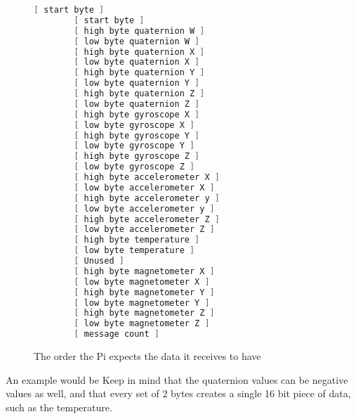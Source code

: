 \begin{figure}[H]
    \begin{lstlisting}[language=c++,firstnumber=0]
        [ start byte ]
        [ start byte ]
        [ high byte quaternion W ]
        [ low byte quaternion W ]
        [ high byte quaternion X ]
        [ low byte quaternion X ]
        [ high byte quaternion Y ]
        [ low byte quaternion Y ]
        [ high byte quaternion Z ]
        [ low byte quaternion Z ]
        [ high byte gyroscope X ]
        [ low byte gyroscope X ]
        [ high byte gyroscope Y ]
        [ low byte gyroscope Y ]
        [ high byte gyroscope Z ]
        [ low byte gyroscope Z ]
        [ high byte accelerometer X ]
        [ low byte accelerometer X ]
        [ high byte accelerometer y ]
        [ low byte accelerometer y ]
        [ high byte accelerometer Z ]
        [ low byte accelerometer Z ]
        [ high byte temperature ]
        [ low byte temperature ]
        [ Unused ]
        [ high byte magnetometer X ]
        [ low byte magnetometer X ]
        [ high byte magnetometer Y ]
        [ low byte magnetometer Y ]
        [ high byte magnetometer Z ]
        [ low byte magnetometer Z ]
        [ message count ]
    \end{lstlisting}
\caption{The order the Pi expects the data it receives to have}
\label{fig::dataformat}
\end{figure}

An example would be  
Keep in mind that the quaternion values can be negative values as well, and that every set of 2 bytes creates a single 16 bit piece of data, such as the temperature.

        
        
        